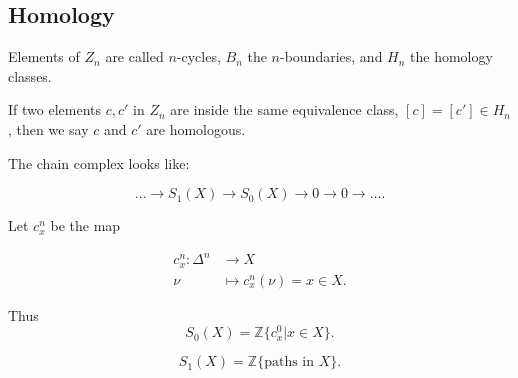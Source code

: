 
\subsection{Homology}

Elements of $Z_n$ are called $n$-cycles, $B_n$ the $n$-boundaries, and $H_n$ the homology classes.

If two elements $c, c'$ in $Z_n$ are inside the same equivalence class, $[c] = [c'] \in H_n$, then we say $c$ and $c'$ are homologous.

The chain complex looks like:

\[
	\ldots \to S_1(X) \to S_0(X) \to 0 \to 0 \to  \ldots
.\] 

\begin{notation}
	Let $c_x^n$ be the map
	
	\begin{align*}
		c_x^n: \Delta^n &\longrightarrow X \\
		\nu &\longmapsto c_x^n(\nu) = x \in X
	.\end{align*}
\end{notation}

Thus
\[
	S_0(X) = \mathbb{Z} \{c_x^0 | x \in X\} 
.\] 

\[
	S_1(X) = \mathbb{Z} \{ \text{paths in }X\} 
.\] 

